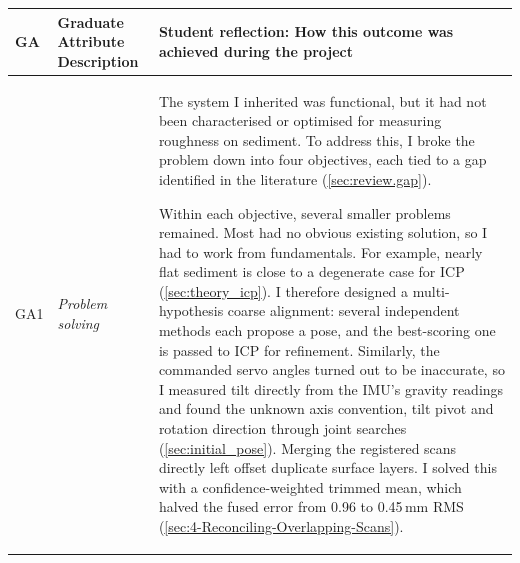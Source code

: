 {\small
	\renewcommand{\arraystretch}{1.5}
	\begin{longtable}{>{\raggedright\arraybackslash}p{} >{\raggedright\arraybackslash}p{} >{\noindent\justifying\arraybackslash}p{}}
		\toprule
		\textbf{GA} & \textbf{Graduate Attribute Description} & \textbf{Student reflection: How this outcome was achieved during the project} \\
		\midrule
		\endhead
		
		GA1 & \textit{Problem solving} &
		
		
		The system I inherited was functional, but it had not been characterised or optimised for measuring roughness on sediment. To address this, I broke the problem down into four objectives, each tied to a gap identified in the literature (\autoref{sec:review.gap}).
		
		Within each objective, several smaller problems remained. Most had no obvious existing solution, so I had to work from fundamentals. For example, nearly flat sediment is close to a degenerate case for ICP (\autoref{sec:theory_icp}). I therefore designed a multi-hypothesis coarse alignment: several independent methods each propose a pose, and the best-scoring one is passed to ICP for refinement. Similarly, the commanded servo angles turned out to be inaccurate, so I measured tilt directly from the IMU's gravity readings and found the unknown axis convention, tilt pivot and rotation direction through joint searches (\autoref{sec:initial_pose}). Merging the registered scans directly left offset duplicate surface layers. I solved this with a confidence-weighted trimmed mean, which halved the fused error from 0.96 to 0.45\,mm RMS (\autoref{sec:4-Reconciling-Overlapping-Scans}).
		\\
		

\end{longtable}}
